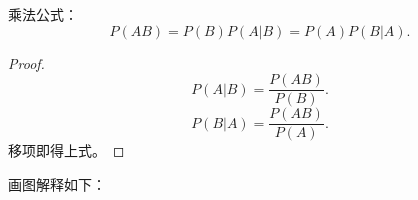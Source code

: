 \begin{rrule}
    乘法公式：
    \[
        P\left( AB \right) =P\left( B \right) P\left( A | B \right) =P\left( A \right) P\left( B | A \right) 
    .\] 
    \begin{proof}
        \[
            P\left( A|B \right) =\frac{P\left( AB \right) }{P\left( B \right) }
        .\] 
        \[
            P\left( B|A \right) =\frac{P\left( AB \right) }{P\left( A \right) }
        .\] 
        移项即得上式。
    \end{proof}
\end{rrule}
画图解释如下：
\begin{center}
\end{center}

























